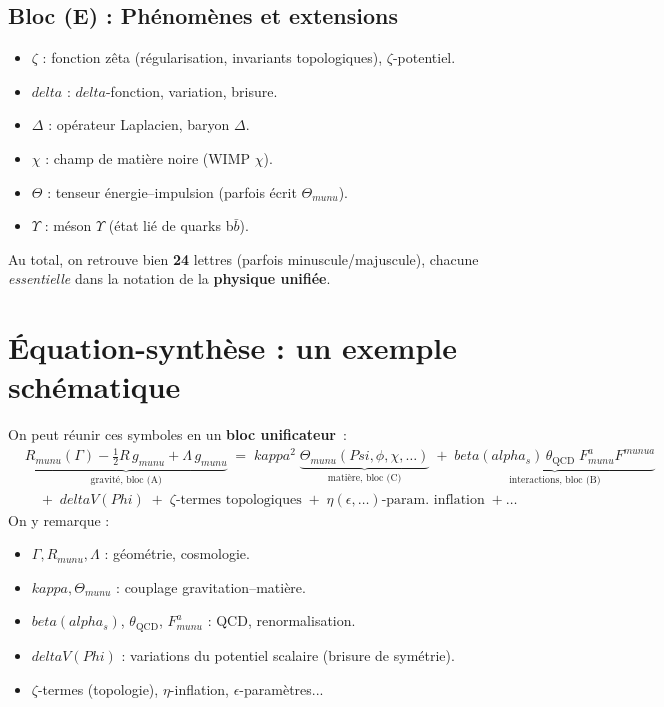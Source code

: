 \documentclass[12pt]{article}
\def\Phi{Phi}%
\def\Psi{Psi}%
\def\kappa{kappa}%
\def\delta{delta}%
\def\mu{mu}%
\def\nu{nu}%
\def\alpha{alpha}%
\def\beta{beta}%
\begin{document}
\subsection{Bloc (E) : Phénomènes et extensions}

\begin{itemize}
    \item \(\zeta\) : fonction zêta (régularisation, invariants topologiques), \(\zeta\)-potentiel.
    \item \(\delta\) : \(\delta\)-fonction, variation, brisure.
    \item \(\Delta\) : opérateur Laplacien, baryon \(\Delta\).
    \item \(\chi\) : champ de matière noire (WIMP \(\chi\)).
    \item \(\Theta\) : tenseur énergie–impulsion (parfois écrit \(\Theta_{\mu\nu}\)).
    \item \(\Upsilon\) : méson \(\Upsilon\) (état lié de quarks b\(\bar{b}\)).
\end{itemize}

Au total, on retrouve bien \textbf{24} lettres (parfois minuscule/majuscule), 
chacune \emph{essentielle} dans la notation de la \textbf{physique unifiée}.

\section{Équation-synthèse : un exemple schématique}

On peut réunir ces symboles en un \textbf{bloc unificateur}~:
\[
\begin{aligned}
&\underbrace{R_{\mu\nu}(\Gamma) 
-\tfrac12 R\,g_{\mu\nu} 
+\Lambda\,g_{\mu\nu}}_{\text{gravité, bloc (A)}}
\;=\; 
\kappa^2 \;\underbrace{\Theta_{\mu\nu}(\Psi,\phi,\chi,\ldots)}_{\text{matière, bloc (C)}}
\;+\;\underbrace{\beta(\alpha_s)\,\theta_{\mathrm{QCD}}\;F_{\mu\nu}^a F^{\mu\nu a}}_{\text{interactions, bloc (B)}}
\\
&\quad
+\;\delta V(\Phi)
\;+\;\zeta\text{-termes topologiques}
\;+\;\eta(\epsilon,\dots)\text{-param. inflation}
\;+\ldots
\end{aligned}
\]
On y remarque :
\begin{itemize}
    \item \(\Gamma, R_{\mu\nu}, \Lambda\) : géométrie, cosmologie.
    \item \(\kappa, \Theta_{\mu\nu}\) : couplage gravitation–matière.
    \item \(\beta(\alpha_s)\), \(\theta_{\mathrm{QCD}}\), \(F_{\mu\nu}^a\) : QCD, renormalisation.
    \item \(\delta V(\Phi)\) : variations du potentiel scalaire (brisure de symétrie).
    \item \(\zeta\)-termes (topologie), \(\eta\)-inflation, \(\epsilon\)-paramètres...
\end{itemize}
\end{document}
